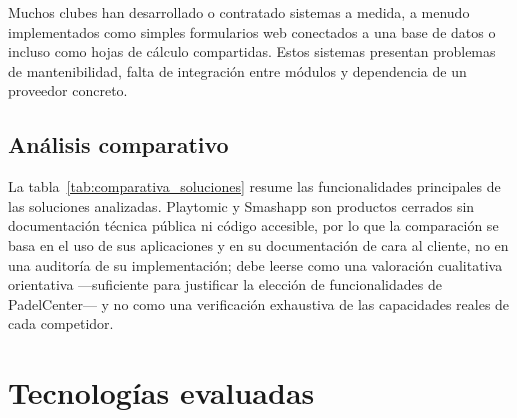 Muchos clubes han desarrollado o contratado sistemas a medida, a menudo
implementados como simples formularios web conectados a una base de datos o
incluso como hojas de cálculo compartidas. Estos sistemas presentan problemas
de mantenibilidad, falta de integración entre módulos y dependencia de un
proveedor concreto.

\subsection{Análisis comparativo}

La tabla~\ref{tab:comparativa_soluciones} resume las funcionalidades principales
de las soluciones analizadas. Playtomic y Smashapp son productos cerrados sin
documentación técnica pública ni código accesible, por lo que la comparación
se basa en el uso de sus aplicaciones y en su documentación de cara al
cliente, no en una auditoría de su implementación; debe leerse como una
valoración cualitativa orientativa —suficiente para justificar la elección
de funcionalidades de PadelCenter— y no como una verificación exhaustiva de
las capacidades reales de cada competidor.

\begin{table}[ht]
\centering
{}
\caption{Comparativa de soluciones existentes.}
\label{tab:comparativa_soluciones}
\end{table}

\section{Tecnologías evaluadas}
\label{sec:tecnologias_evaluadas}

